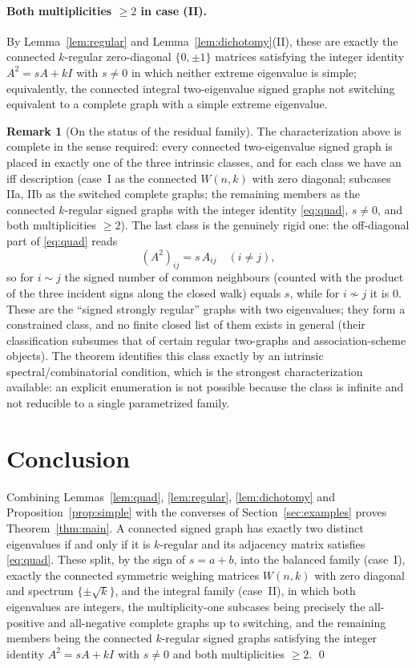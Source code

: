 \documentclass{amsart}
\theoremstyle{definition}
\newtheorem{remark}{Remark}
\begin{document}
\paragraph{Both multiplicities $\ge2$ in case (II).}
By Lemma~\ref{lem:regular} and Lemma~\ref{lem:dichotomy}(II), these are exactly
the connected $k$-regular zero-diagonal $\{0,\pm1\}$ matrices satisfying the
integer identity $A^2=sA+kI$ with $s\ne0$ in which neither extreme eigenvalue
is simple; equivalently, the connected integral two-eigenvalue signed graphs
not switching equivalent to a complete graph with a simple extreme eigenvalue.

\begin{remark}[On the status of the residual family]\label{rem:residual}
The characterization above is complete in the sense required: every connected
two-eigenvalue signed graph is placed in exactly one of the three intrinsic
classes, and for each class we have an iff description (case~I as the connected
$W(n,k)$ with zero diagonal; subcases IIa, IIb as the switched complete graphs;
the remaining members as the connected $k$-regular signed graphs with the
integer identity \eqref{eq:quad}, $s\ne0$, and both multiplicities $\ge2$).
The last class is the genuinely rigid one: the off-diagonal part of
\eqref{eq:quad} reads
\[
(A^2)_{ij}=s\,A_{ij}\quad(i\ne j),
\]
so for $i\sim j$ the signed number of common neighbours (counted with the
product of the three incident signs along the closed walk) equals $s$, while for
$i\not\sim j$ it is $0$. These are the ``signed strongly regular'' graphs with
two eigenvalues; they form a constrained class, and no finite closed list of
them exists in general (their classification subsumes that of certain regular
two-graphs and association-scheme objects). The theorem identifies this class
exactly by an intrinsic spectral/combinatorial condition, which is the strongest
characterization available: an explicit enumeration is not possible because the
class is infinite and not reducible to a single parametrized family.
\end{remark}

\section{Conclusion}\label{sec:conclusion}

Combining Lemmas~\ref{lem:quad}, \ref{lem:regular}, \ref{lem:dichotomy} and
Proposition~\ref{prop:simple} with the converses of
Section~\ref{sec:examples} proves Theorem~\ref{thm:main}. A connected signed
graph has exactly two distinct eigenvalues if and only if it is $k$-regular and
its adjacency matrix satisfies \eqref{eq:quad}. These split, by the sign of
$s=a+b$, into the balanced family (case~I), exactly the connected symmetric
weighing matrices $W(n,k)$ with zero diagonal and spectrum $\{\pm\sqrt k\}$,
and the integral family (case~II), in which both eigenvalues are integers,
the multiplicity-one subcases being precisely the all-positive and
all-negative complete graphs up to switching, and the remaining members being
the connected $k$-regular signed graphs satisfying the integer identity
$A^2=sA+kI$ with $s\ne0$ and both multiplicities $\ge2$.
\qed
\end{document}
